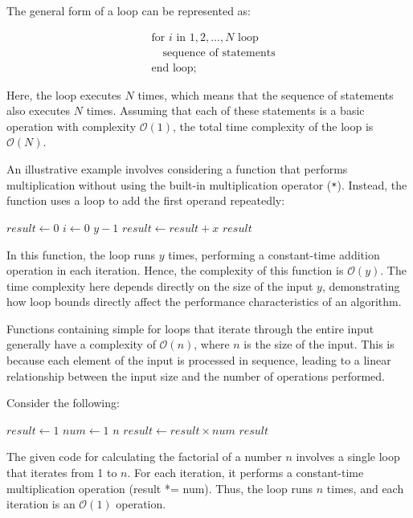 The general form of a loop can be represented as:

\[
\begin{aligned}
& \text{for } i \text{ in } 1, 2, \ldots, N \text{ loop} \\
& \quad \text{sequence of statements} \\
& \text{end loop;}
\end{aligned}
\]

Here, the loop executes $N$ times, which means that the sequence of statements also executes $N$ times. Assuming that each of these statements is a basic operation with complexity $\mathcal{O}(1)$, the total time complexity of the loop is $\mathcal{O}(N)$. 

An illustrative example involves considering a function that performs multiplication without using the built-in multiplication operator (\texttt{*}). Instead, the function uses a loop to add the first operand repeatedly:

\begin{codebox}
    \li $result \gets 0$
    \li \For $i \gets 0$ \To $y - 1$ \Do
    \li     $result \gets result + x$
        \End
    \li \Return $result$
\end{codebox}

In this function, the loop runs $y$ times, performing a constant-time addition operation in each iteration. Hence, the complexity of this function is $\mathcal{O}(y)$. The time complexity here depends directly on the size of the input $y$, demonstrating how loop bounds directly affect the performance characteristics of an algorithm.

Functions containing simple for loops that iterate through the entire input generally have a complexity of $\mathcal{O}(n)$, where $n$ is the size of the input. This is because each element of the input is processed in sequence, leading to a linear relationship between the input size and the number of operations performed.

Consider the following:

\begin{codebox}
    \li $result \gets 1$
    \li \For $num \gets 1$ \To $n$ \Do
    \li     $result \gets result \times num$
        \End
    \li \Return $result$
\end{codebox}


The given code for calculating the factorial of a number \( n \) involves a single loop that iterates from 1 to \( n \). For each iteration, it performs a constant-time multiplication operation (result *= num). Thus, the loop runs \( n \) times, and each iteration is an \(\mathcal{O}(1)\) operation.

